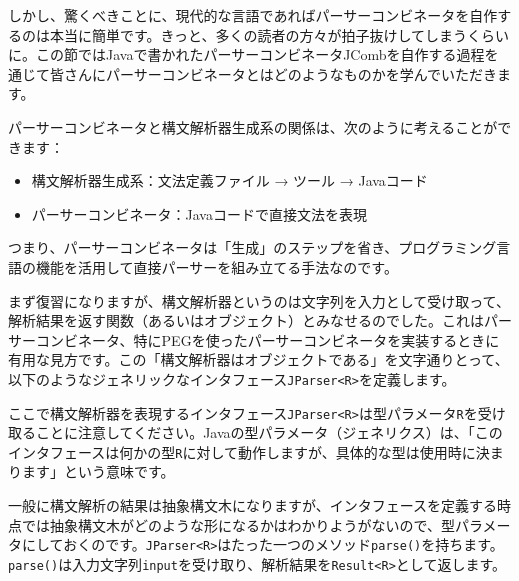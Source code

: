 しかし、驚くべきことに、現代的な言語であればパーサーコンビネータを自作するのは本当に簡単です。きっと、多くの読者の方々が拍子抜けしてしまうくらいに。この節ではJavaで書かれたパーサーコンビネータJCombを自作する過程を通じて皆さんにパーサーコンビネータとはどのようなものかを学んでいただきます。

パーサーコンビネータと構文解析器生成系の関係は、次のように考えることができます：

\begin{itemize}
\tightlist
\item
  構文解析器生成系：文法定義ファイル → ツール → Javaコード
\item
  パーサーコンビネータ：Javaコードで直接文法を表現
\end{itemize}

つまり、パーサーコンビネータは「生成」のステップを省き、プログラミング言語の機能を活用して直接パーサーを組み立てる手法なのです。

まず復習になりますが、構文解析器というのは文字列を入力として受け取って、解析結果を返す関数（あるいはオブジェクト）とみなせるのでした。これはパーサーコンビネータ、特にPEGを使ったパーサーコンビネータを実装するときに有用な見方です。この「構文解析器はオブジェクトである」を文字通りとって、以下のようなジェネリックなインタフェース\texttt{JParser\textless{}R\textgreater{}}を定義します。

\begin{Shaded}
\begin{Highlighting}[]
  \NormalTok{(}
\NormalTok{\}}
\end{Highlighting}
\end{Shaded}

ここで構文解析器を表現するインタフェース\texttt{JParser\textless{}R\textgreater{}}は型パラメータ\texttt{R}を受け取ることに注意してください。Javaの型パラメータ（ジェネリクス）は、「このインタフェースは何かの型\texttt{R}に対して動作しますが、具体的な型は使用時に決まります」という意味です。

一般に構文解析の結果は抽象構文木になりますが、インタフェースを定義する時点では抽象構文木がどのような形になるかはわかりようがないので、型パラメータにしておくのです。\texttt{JParser\textless{}R\textgreater{}}はたった一つのメソッド\texttt{parse()}を持ちます。\texttt{parse()}は入力文字列\texttt{input}を受け取り、解析結果を\texttt{Result\textless{}R\textgreater{}}として返します。


